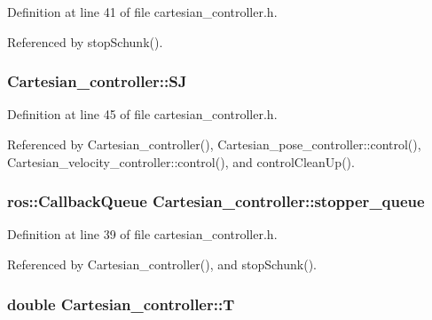 Definition at line 41 of file cartesian\-\_\-controller.\-h.



Referenced by stop\-Schunk().

\hypertarget{classCartesian__controller_a98fdac06d136ac3dba0102d97cd5dd36}{
\subsubsection[{S\-J}]{ Cartesian\-\_\-controller\-::\-S\-J\hspace{0.3cm}{\ttfamily [protected]}}}\label{classCartesian__controller_a98fdac06d136ac3dba0102d97cd5dd36}


Definition at line 45 of file cartesian\-\_\-controller.\-h.



Referenced by Cartesian\-\_\-controller(), Cartesian\-\_\-pose\-\_\-controller\-::control(), Cartesian\-\_\-velocity\-\_\-controller\-::control(), and control\-Clean\-Up().

\hypertarget{classCartesian__controller_a52eb090400d8dafaa22aecb037788a66}{
\subsubsection[{stopper\-\_\-queue}]{\setlength{\rightskip}{0pt plus 5cm}ros\-::\-Callback\-Queue Cartesian\-\_\-controller\-::stopper\-\_\-queue\hspace{0.3cm}{\ttfamily [protected]}}}\label{classCartesian__controller_a52eb090400d8dafaa22aecb037788a66}


Definition at line 39 of file cartesian\-\_\-controller.\-h.



Referenced by Cartesian\-\_\-controller(), and stop\-Schunk().

\hypertarget{classCartesian__controller_a35c6ddbb9624878f2807ff644a33e832}{
\subsubsection[{T}]{\setlength{\rightskip}{0pt plus 5cm}double Cartesian\-\_\-controller\-::\-T\hspace{0.3cm}{\ttfamily [protected]}}}\label{classCartesian__controller_a35c6ddbb9624878f2807ff644a33e832}


